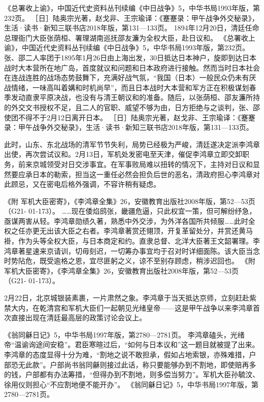 \documentclass[12pt,UTF8]{ctexbook}
\begin{document}
《总署收上谕》，中国近代史资料丛刊续编《中日战争》5，中华书局1993年版，第232页。
［日］陆奥宗光著，赵戈非、王宗瑜译：《蹇蹇录：甲午战争外交秘录》，生活·读书·新知三联书店2018年版，第131—133页。
1894年12月20日，清廷任命总理衙门大臣张荫桓、署理湖南巡抚邵友濂为全权大臣，赴日议和。 《总署收上谕》，中国近代史资料丛刊续编《中日战争》5，中华书局1993年版，第232页。张、邵二人率团于1895年1月26日由上海出发，30日抵达日本神户，旋即到达日本战时大本营所在地广岛，首度就议和问题和日本政府进行接触。然而当时日本社会在连战连胜的战场态势鼓舞下，充满好战气氛，“我国（日本）一般民众仍未有厌战情绪，一味高叫着媾和时机尚早”，而且日本战时大本营和军方正在积极谋划春季发动直隶平原决战，也没有与清王朝议和的准备。随后，以张荫桓、邵友濂所持的外交文书授权不足，且二人的官职、威望不够为由，日方拒绝与之谈判，张、邵使团不得不于2月12日离开日本。 ［日］陆奥宗光著，赵戈非、王宗瑜译：《蹇蹇录：甲午战争外交秘录》，生活·读书·新知三联书店2018年版，第131—133页。

此时，山东、东北战场的清军节节失利，局势已经极为严峻，清廷遂决定派李鸿章出使，再次尝试议和。2月13日，军机处发密电至天津，催促李鸿章立即交卸职务，前来京城领受对日交涉事宜。在军事败局难以扭转的情况下，主持对日议和显然要应承日本的勒索，担当这一重任必然会担负后世的恶名，清政府担心李鸿章对此顾忌，又在密电后格外强调，不容许稍有疑虑。

《附 军机大臣密寄》，《李鸿章全集》26，安徽教育出版社2008年版，第52—53页（G21- 01-173）。
……现在倭焰鸱张，畿疆危逼，只此权宜一策，但可解纷纾急，亟谋两害从轻。李鸿章勋绩久著，熟悉中外交涉，为外洋各国所共倾服……此时全权之任亦更无出该大臣之右者。李鸿章著赏还翎顶，开复革留处分，并赏还黄马褂，作为头等全权大臣，与日本商定和约。直隶总督、北洋大臣著王文韶署理。李鸿章著星速来京请训，切毋刻迟，一切筹办事宜均于召对时详细面陈。该大臣当念时势阽危，既受逾格之恩，宜尽匪躬之义，谅不至别存顾虑，稍涉迟回也。 《附 军机大臣密寄》，《李鸿章全集》26，安徽教育出版社2008年版，第52—53页（G21- 01-173）。

2月22日，北京城银装素裹，一片肃然之象。李鸿章于当天抵达京师，立刻赶赴紫禁大内，在乾清宫和军机大臣们一起朝见光绪皇帝——这是甲午战争以来李鸿章首次直接出现在清廷最高层的政策讨论会议上。

《翁同龢日记》5，中华书局1997年版，第2780—2781页。
李鸿章磕头，光绪帝“温谕询途间安稳”。君臣寒暄过后，“如何与日本议和”这一题目就被提了出来。李鸿章的态度显得十分为难，“割地之说不敢担承，假如占地索银，亦殊难措，户部恐无此款”。户部尚书翁同龢则接过此话，称只要能够办到不割地，即使赔再多的钱，户部都有办法筹措，“但得办到不割地，则多偿当努力”。军机大臣孙毓汶、徐用仪则担心“不应割地便不能开办”。 《翁同龢日记》5，中华书局1997年版，第2780—2781页。
\end{document}
